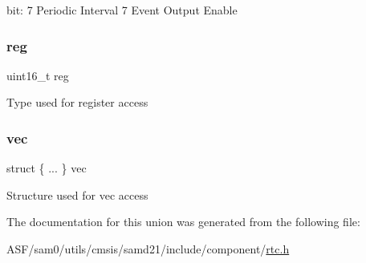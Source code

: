 bit\+: 7 Periodic Interval 7 Event Output Enable \mbox{\label{union_r_t_c___m_o_d_e2___e_v_c_t_r_l___type_a11760f5020019f4aa8cb02e694f7cc44}} 
\subsubsection{\texorpdfstring{reg}{reg}}
{\footnotesize\ttfamily uint16\+\_\+t reg}

Type used for register access \mbox{\label{union_r_t_c___m_o_d_e2___e_v_c_t_r_l___type_ac64d504f5bc5bd75af796bee49ba21e4}} 
\subsubsection{\texorpdfstring{vec}{vec}}
{\footnotesize\ttfamily struct \{ ... \}   vec}

Structure used for vec access 

The documentation for this union was generated from the following file\+:\begin{DoxyCompactItemize}
\item 
A\+S\+F/sam0/utils/cmsis/samd21/include/component/\mbox{\hyperlink{component_2rtc_8h}{rtc.\+h}}\end{DoxyCompactItemize}
